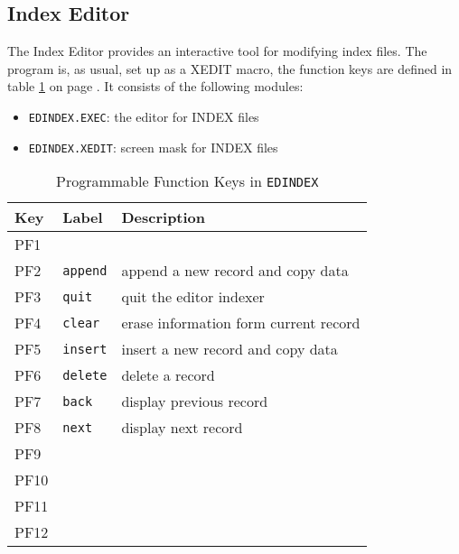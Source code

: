 


\subsection{Index Editor}

The Index Editor provides an interactive tool for modifying index files.
The program is, as usual, set up as a XEDIT macro, the function keys are
defined in table \ref{EDINDEX} on page \pageref{EDINDEX}.
It consists of the following modules:
\begin{itemize} 
\item  {\tt EDINDEX.EXEC}:  the editor for INDEX files\\
\item  {\tt EDINDEX.XEDIT}: screen mask for INDEX files
\end{itemize}

\begin{table}
\caption{Programmable Function Keys in {\tt EDINDEX}}\label{EDINDEX}
\rule{0mm}{2mm}
\begin{center}
\noindent\begin{tabular}{|l|l|l|}
\hline
Key     & Label             & Description\\
\hline\hline
PF1     &                   &                                               \\
PF2     & {\tt append}      & append a new record and copy data             \\
PF3     & {\tt quit}        & quit the editor indexer                       \\
PF4     & {\tt clear}       & erase information form current record         \\
\hline
PF5     & {\tt insert}      & insert a new record and copy data             \\
PF6     & {\tt delete}      & delete a record                               \\
PF7     & {\tt back}        & display previous record                       \\
PF8     & {\tt next}        & display next record                           \\
\hline
PF9     &                   &                                               \\
PF10    &                   &                                               \\
PF11    &                   &                                               \\
PF12    &                   &                                               \\
\hline
\end{tabular}
\end{center}
\end{table}



